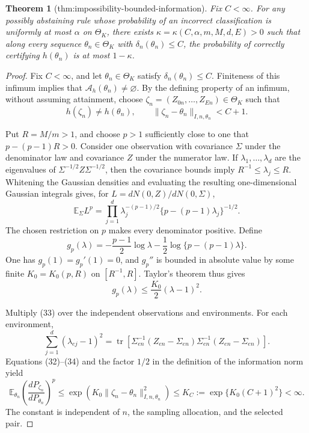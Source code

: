 \documentclass{article}
\newtheorem{theorem}{Theorem}
\begin{document}
\begin{theorem}[thm:impossibility-bounded-information]\label{thm:impossibility-bounded-information}
Fix \(C<\infty\).  For any possibly abstaining rule whose probability of an incorrect classification is uniformly at most \(\alpha\) on \(\Theta_K\), there exists \(\kappa=\kappa(C,\alpha,m,M,d,E)>0\) such that along every sequence \(\theta_n\in\Theta_K\) with \(\delta_n(\theta_n)\le C\), the probability of correctly certifying \(h(\theta_n)\) is at most \(1-\kappa\).
\end{theorem}
\begin{proof}
Fix \(C<\infty\), and let \(\theta_n\in\Theta_K\) satisfy \(\delta_n(\theta_n)\le C\).  Finiteness of this infimum implies that \(\mathcal A_h(\theta_n)\ne\varnothing\).  By the defining property of an infimum, without assuming attainment, choose \(\zeta_n=(Z_{0n},\ldots,Z_{En})\in\Theta_K\) such that
\[
 h(\zeta_n)\ne h(\theta_n),
 \qquad
 \lVert\zeta_n-\theta_n\rVert_{I,n,\theta_n}<C+1. \tag{32}
\]

Put \(R=M/m>1\), and choose \(p>1\) sufficiently close to one that
\(p-(p-1)R>0\).  Consider one observation with covariance \(\Sigma\) under the denominator law and covariance \(Z\) under the numerator law.  If \(\lambda_1,\ldots,\lambda_d\) are the eigenvalues of \(\Sigma^{-1/2}Z\Sigma^{-1/2}\), then the covariance bounds imply \(R^{-1}\le\lambda_j\le R\).  Whitening the Gaussian densities and evaluating the resulting one-dimensional Gaussian integrals gives, for \(L=dN(0,Z)/dN(0,\Sigma)\),
\[
 \mathbb E_\Sigma L^p
 =\prod_{j=1}^d
 \lambda_j^{-(p-1)/2}\{p-(p-1)\lambda_j\}^{-1/2}. \tag{33}
\]
The chosen restriction on \(p\) makes every denominator positive.  Define
\[
 g_p(\lambda)=-\frac{p-1}{2}\log\lambda
 -\frac12\log\{p-(p-1)\lambda\}.
\]
One has \(g_p(1)=g_p'(1)=0\), and \(g_p''\) is bounded in absolute value by some finite \(K_0=K_0(p,R)\) on \([R^{-1},R]\).  Taylor's theorem thus gives
\[
 g_p(\lambda)\le\frac{K_0}{2}(\lambda-1)^2. \tag{34}
\]

Multiply (33) over the independent observations and environments.  For each environment,
\[
 \sum_{j=1}^d(\lambda_{ej}-1)^2
 =\operatorname{tr}\!\left[
 \Sigma_{en}^{-1}(Z_{en}-\Sigma_{en})
 \Sigma_{en}^{-1}(Z_{en}-\Sigma_{en})\right].
\]
Equations (32)--(34) and the factor \(1/2\) in the definition of the information norm yield
\[
 \mathbb E_{\theta_n}\left(\frac{dP_{\zeta_n}}{dP_{\theta_n}}\right)^p
 \le \exp\!\left(K_0\lVert\zeta_n-\theta_n\rVert_{I,n,\theta_n}^2\right)
 \le K_C:=\exp\{K_0(C+1)^2\}<\infty. \tag{35}
\]
The constant is independent of \(n\), the sampling allocation, and the selected pair.


\end{proof}
\end{document}
